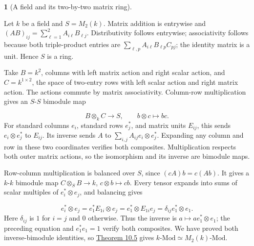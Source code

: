 \documentclass[11pt,a4paper]{article}
\newcommand{\mathheading}{}
\theoremstyle{plain}
\theoremstyle{definition}
\newtheorem*{definitionstatement}{\mathheading}
\newenvironment{mathdefinition}[3]{\renewcommand{\mathheading}{#1 #2}\begin{definitionstatement}[#3]}{\end{definitionstatement}}
\begin{document}
\begin{mathdefinition}{Example}{10.6}{A field and its two-by-two matrix ring}
\label{env-10-6}

Let \(k\) be a field and \(S=M_2(k)\). Matrix addition is entrywise and \((AB)_{ij}=\sum_{\ell=1}^2A_{i\ell}B_{\ell j}\). Distributivity follows entrywise; associativity follows because both triple-product entries are \(\sum_{\ell,p}A_{i\ell}B_{\ell p}C_{pj}\); the identity matrix is a unit. Hence \(S\) is a ring.

 
Take \(B=k^2\), columns with left matrix action and right scalar action, and \(C=k^{1\times2}\), the space of two-entry rows with left scalar action and right matrix action. The actions commute by matrix associativity. Column-row multiplication gives an \(S\)-\(S\) bimodule map

 \[B\otimes_kC\longrightarrow S,\qquad b\otimes c\longmapsto bc.\] 
For standard columns \(e_i\), standard rows \(e_j^*\), and matrix units \(E_{ij}\), this sends \(e_i\otimes e_j^*\) to \(E_{ij}\). Its inverse sends \(A\) to \(\sum_{i,j}A_{ij}e_i\otimes e_j^*\). Expanding any column and row in these two coordinates verifies both composites. Multiplication respects both outer matrix actions, so the isomorphism and its inverse are bimodule maps.

 
Row-column multiplication is balanced over \(S\), since \((cA)b=c(Ab)\). It gives a \(k\)-\(k\) bimodule map \(C\otimes_SB\to k\), \(c\otimes b\mapsto cb\). Every tensor expands into sums of scalar multiples of \(e_i^*\otimes e_j\), and balancing gives

 \[e_i^*\otimes e_j=e_1^*E_{1i}\otimes e_j=e_1^*\otimes E_{1i}e_j=\delta_{ij}e_1^*\otimes e_1.\] 
Here \(\delta_{ij}\) is \(1\) for \(i=j\) and \(0\) otherwise. Thus the inverse is \(a\mapsto a e_1^*\otimes e_1\); the preceding equation and \(e_1^*e_1=1\) verify both composites. We have proved both inverse-bimodule identities, so \hyperref[env-10-5]{Theorem 10.5} gives \(k\text{-Mod}\simeq M_2(k)\text{-Mod}\).


\par{}\par

\end{mathdefinition}
 
\end{document}

